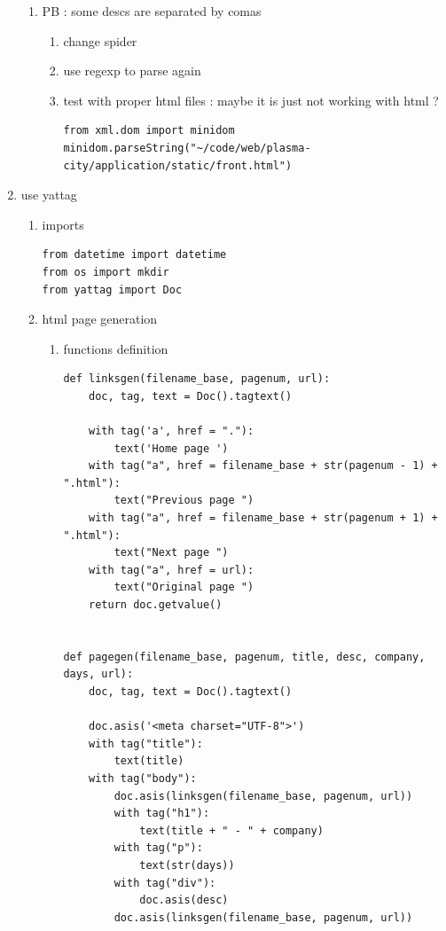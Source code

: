 \documentclass[11pt]{article}
\begin{document}
\begin{enumerate}
\begin{enumerate}
\item PB : some descs are separated by comas
\label{sec:org60fa7a9}
\begin{enumerate}
\item change spider
\label{sec:org852d23d}
\item use regexp to parse again
\label{sec:org941b2dc}
\item test with proper html files : maybe it is just not working with html ?
\label{sec:orge4f473d}
\begin{verbatim}
from xml.dom import minidom
minidom.parseString("~/code/web/plasma-city/application/static/front.html")
\end{verbatim}
\end{enumerate}
\end{enumerate}

\item use yattag
\label{sec:org87496c1}
\begin{enumerate}
\item imports
\label{sec:orgc7805d1}
\begin{verbatim}
from datetime import datetime
from os import mkdir
from yattag import Doc
\end{verbatim}

\item html page generation
\label{sec:orgfad04f1}
\begin{enumerate}
\item functions definition
\label{sec:org3145502}
\begin{verbatim}
def linksgen(filename_base, pagenum, url):
    doc, tag, text = Doc().tagtext()

    with tag('a', href = "."):
        text('Home page ')
    with tag("a", href = filename_base + str(pagenum - 1) + ".html"):
        text("Previous page ")
    with tag("a", href = filename_base + str(pagenum + 1) + ".html"):
        text("Next page ")
    with tag("a", href = url):
        text("Original page ")
    return doc.getvalue()


def pagegen(filename_base, pagenum, title, desc, company, days, url):
    doc, tag, text = Doc().tagtext()
    
    doc.asis('<meta charset="UTF-8">')
    with tag("title"):
        text(title)
    with tag("body"):
        doc.asis(linksgen(filename_base, pagenum, url))
        with tag("h1"):
            text(title + " - " + company)
        with tag("p"):
            text(str(days))
        with tag("div"):
            doc.asis(desc)
        doc.asis(linksgen(filename_base, pagenum, url))


\end{verbatim}
\end{enumerate}
\end{enumerate}
\end{enumerate}
\end{document}
